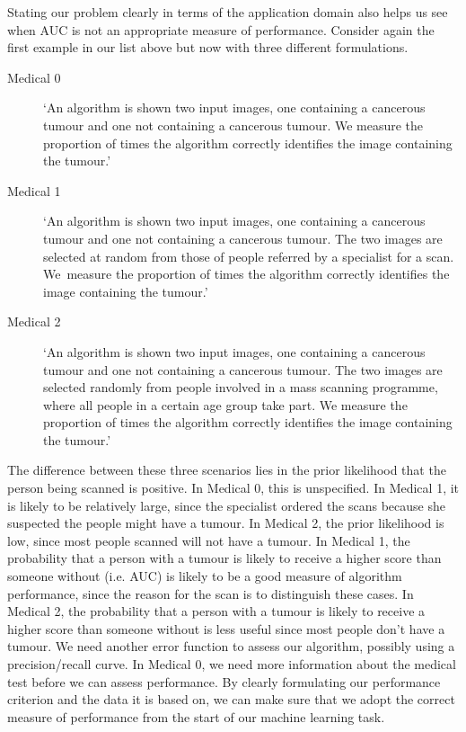 Stating our problem clearly in terms of the application domain also helps us see when AUC is not an appropriate measure of performance. Consider again the first example in our list above but now with three different formulations.
\begin{description}
\item[Medical 0] `An algorithm is shown two input images, one containing a cancerous tumour and one not containing a cancerous tumour.  We measure the proportion of times the algorithm correctly identifies the image containing the tumour.'
\item[Medical 1] `An algorithm is shown two input images, one containing a cancerous tumour and one not containing a cancerous tumour. The two images are selected at\vadjust{\pagebreak} random from those of people referred by a specialist for a scan. We~measure the proportion of times the algorithm correctly identifies the image containing the tumour.'
\item[Medical 2] `An algorithm is shown two input images, one containing a cancerous tumour and one not containing a cancerous tumour. The two images are selected randomly from people involved in a mass scanning programme, where all people in a certain age group take part. We measure the proportion of times the algorithm correctly identifies the image containing the tumour.'
\end{description}
The difference between these three scenarios lies in the prior likelihood that the person being scanned is positive. In Medical 0, this is unspecified. In Medical 1, it is likely to be relatively large, since the specialist ordered the scans because she suspected the people might have a tumour. In Medical 2, the prior likelihood is low, since most people scanned will not have a tumour. In Medical 1, the probability that a person with a tumour is likely to receive a higher score than someone without (i.e. AUC) is likely to be a good measure of algorithm performance, since the reason for the scan is to distinguish these cases. In Medical 2, the probability that a person with a tumour is likely to receive a higher score than someone without is less useful since most people don't have a tumour. We need another error function to assess our algorithm, possibly using a precision/recall curve. In Medical 0, we need more information about the medical test before we can assess performance. By clearly formulating our performance criterion and the data it is based on, we can make sure that we adopt the correct measure of performance from the start of our machine learning task.

